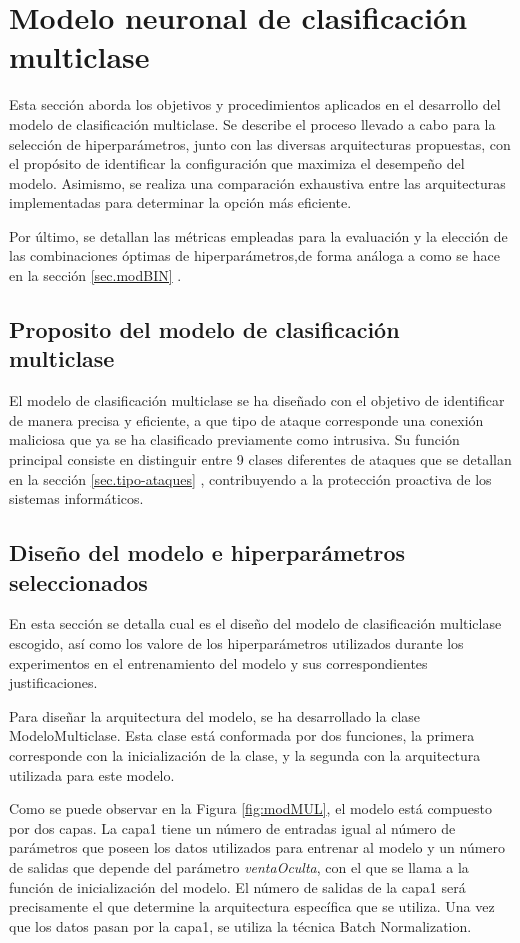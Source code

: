 \section{Modelo neuronal de clasificación multiclase}
Esta sección aborda los objetivos y procedimientos aplicados en el desarrollo del modelo de clasificación multiclase. Se describe el proceso llevado a cabo para la selección de hiperparámetros, junto con las diversas arquitecturas propuestas, con el propósito de identificar la configuración que maximiza el desempeño del modelo. Asimismo, se realiza una comparación exhaustiva entre las arquitecturas implementadas para determinar la opción más eficiente.

Por último, se detallan las métricas empleadas para la evaluación y la elección de las combinaciones óptimas de hiperparámetros,de forma análoga a como se hace en la sección \ref{sec.modBIN} .

\subsection{Proposito del modelo de clasificación multiclase}

El modelo de clasificación multiclase se ha diseñado con el objetivo de identificar de manera precisa y eficiente, a que tipo de ataque corresponde una conexión maliciosa que ya se ha clasificado previamente como intrusiva. Su función principal consiste en distinguir entre 9 clases diferentes de ataques que se detallan en la sección \ref{sec.tipo-ataques} , contribuyendo a la protección proactiva de los sistemas informáticos.

\subsection{Diseño del modelo e hiperparámetros seleccionados} \label{sec:disMUL}
En esta sección se detalla cual es el diseño del modelo de clasificación multiclase escogido, así como los valore de los hiperparámetros utilizados durante los experimentos en el entrenamiento del modelo y sus correspondientes justificaciones.

Para diseñar la arquitectura del modelo, se ha desarrollado la clase ModeloMulticlase. Esta clase está conformada por dos funciones, la primera corresponde con la inicialización de la clase, y la segunda con la arquitectura utilizada para este modelo.

Como se puede observar en la Figura \ref{fig:modMUL}, el modelo está compuesto por dos capas. La capa1 tiene un número de entradas igual al número de parámetros que poseen los datos utilizados para entrenar al modelo y un número de salidas que depende del parámetro \textit{ventaOculta}, con el que se llama a la función de inicialización del modelo. El número de salidas de la capa1 será precisamente el que determine la arquitectura específica que se utiliza. Una vez que los datos pasan por la capa1, se utiliza la técnica Batch Normalization. 

